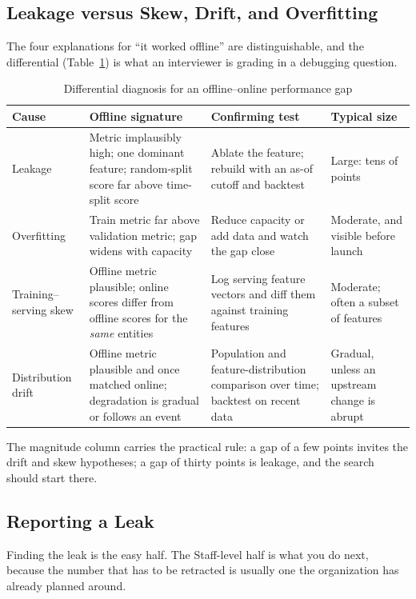 \subsection{Leakage versus Skew, Drift, and Overfitting}

The four explanations for ``it worked offline'' are distinguishable, and the differential (Table~\ref{cml:tab:leak_differential}) is what an interviewer is grading in a debugging question.

\begin{table}[H]
\centering
\small
\caption{Differential diagnosis for an offline--online performance gap}
\label{cml:tab:leak_differential}
\begin{tabularx}{\textwidth}{lXXX}
\toprule
\textbf{Cause} & \textbf{Offline signature} & \textbf{Confirming test} & \textbf{Typical size} \\
\midrule
Leakage & Metric implausibly high; one dominant feature; random-split score far above time-split score & Ablate the feature; rebuild with an as-of cutoff and backtest & Large: tens of points \\
Overfitting & Train metric far above validation metric; gap widens with capacity & Reduce capacity or add data and watch the gap close & Moderate, and visible before launch \\
Training--serving skew & Offline metric plausible; online scores differ from offline scores for the \emph{same} entities & Log serving feature vectors and diff them against training features & Moderate; often a subset of features \\
Distribution drift & Offline metric plausible and once matched online; degradation is gradual or follows an event & Population and feature-distribution comparison over time; backtest on recent data & Gradual, unless an upstream change is abrupt \\
\bottomrule
\end{tabularx}
\end{table}

The magnitude column carries the practical rule: a gap of a few points invites the drift and skew hypotheses; a gap of thirty points is leakage, and the search should start there.

\subsection{Reporting a Leak}

Finding the leak is the easy half. The Staff-level half is what you do next, because the number that has to be retracted is usually one the organization has already planned around.

